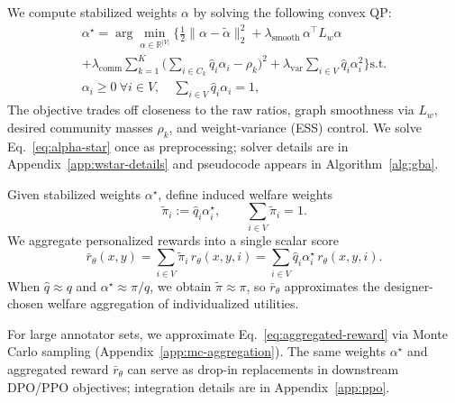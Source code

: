 \documentclass{article}
\theoremstyle{plain}
\theoremstyle{definition}
\theoremstyle{remark}
\begin{document}
We compute stabilized weights $\alpha$ by solving the following convex QP:
\begin{equation}
\begin{aligned}
    \alpha^\star
    = \arg\min_{\alpha \in \mathbb{R}^{|V|}}
    \Bigg\{
        \frac{1}{2}\|\alpha-\tilde\alpha\|_2^2
        + \lambda_{\text{smooth}}\, \alpha^\top L_w \alpha \qquad \\
        + \lambda_{\text{comm}} \sum_{k=1}^{K}
          \Big( \sum_{i \in C_k} \hat q_i \alpha_i - \rho_k \Big)^2
        + \lambda_{\text{var}} \sum_{i \in V} \hat q_i \alpha_i^2
    \Bigg\}
    \text{s.t.}\\
    \alpha_i \ge 0\ \forall i\in V,
    \quad
    \sum_{i \in V} \hat q_i \alpha_i = 1, \qquad\qquad\qquad
\end{aligned}
\label{eq:alpha-star}
\end{equation}
The objective trades off closeness to the raw ratios, graph smoothness via $L_w$,
desired community masses $\rho_k$, and weight-variance (ESS) control.
We solve Eq.~\eqref{eq:alpha-star} once as preprocessing; solver details are in
Appendix~\ref{app:wstar-details} and pseudocode appears in Algorithm~\ref{alg:gba}.

Given stabilized weights $\alpha^\star$, define induced welfare weights
\begin{equation}
    \tilde\pi_i := \hat q_i \alpha_i^\star,
    \qquad \sum_{i\in V}\tilde\pi_i = 1.
\end{equation}
We aggregate personalized rewards into a single scalar score
\begin{equation}
    \bar r_\theta(x,y)
    =
    \sum_{i \in V} \tilde\pi_i\, r_\theta(x,y,i)
    =
    \sum_{i \in V} \hat q_i \alpha_i^\star\, r_\theta(x,y,i).
    \label{eq:aggregated-reward}
\end{equation}
When $\hat q \approx q$ and $\alpha^\star \approx \pi/q$, we obtain
$\tilde\pi \approx \pi$, so $\bar r_\theta$ approximates the designer-chosen
welfare aggregation of individualized utilities.

For large annotator sets, we approximate Eq.~\eqref{eq:aggregated-reward} via Monte Carlo sampling (Appendix~\ref{app:mc-aggregation}). The same weights $\alpha^\star$ and aggregated reward $\bar r_\theta$ can serve as drop-in replacements in downstream DPO/PPO objectives; integration details are in Appendix~\ref{app:ppo}.

\end{document}

